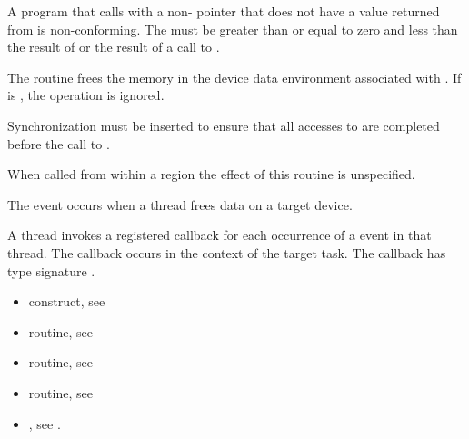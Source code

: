 \constraints

A program that calls  with a non- pointer 
that does not have a value returned from  is
non-conforming.  The  must be greater than or equal to 
zero and less than the result of  or the
 result of a call to .

\effect

The  routine frees the memory in the device data
environment associated with .  If  is
, the operation is ignored.

Synchronization must be inserted to ensure that all accesses to 
 are completed before the call to .

When called from within a  region the effect of this routine
is unspecified.

\events
The  event occurs when a thread frees data on a target device.

\tools

A thread invokes a registered 
callback for each occurrence of a  event in that thread. 
The callback occurs in the context of the target task.  The callback has type signature
. 


\crossreferences
\begin{itemize}
\item {} construct, see 

\item {} routine, see 

\item {} routine, see 

\item {} routine, see 

\item {}, see 
.

\end{itemize}



\pagebreak
{}
